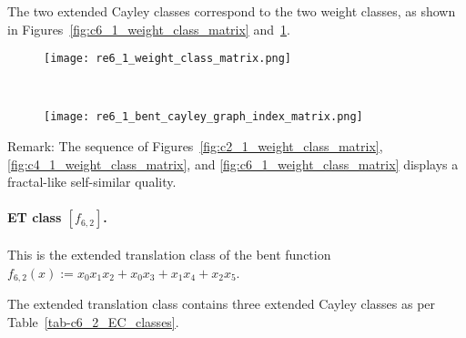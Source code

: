 \documentclass[12pt,a4paper]{article}
\begin{document}

The two extended Cayley classes correspond to the two weight classes,
as shown in Figures~\ref{fig:c6_1_weight_class_matrix} and~\ref{fig:c6_1_bent_cayley_graph_index_matrix}.

\begin{figure}[!bhpt] %
\centering
\begin{minipage}{.48\textwidth}
  \centering
  \texttt{[image: re6\_1\_weight\_class\_matrix.png]}
  \label{fig:c6_1_weight_class_matrix}
\end{minipage}%
~~~~
\begin{minipage}{.48\textwidth}
  \centering
  \texttt{[image: re6\_1\_bent\_cayley\_graph\_index\_matrix.png]}
  \label{fig:c6_1_bent_cayley_graph_index_matrix}
\end{minipage}
\end{figure}

Remark: The sequence of Figures~\ref{fig:c2_1_weight_class_matrix}, \ref{fig:c4_1_weight_class_matrix},
and \ref{fig:c6_1_weight_class_matrix} displays a fractal-like self-similar quality.

\paragraph*{ET class $[f_{6,2}]$.}
%
This is the extended translation class of the bent function
$f_{6,2}(x) := x_{0} x_{1} x_{2} + x_{0} x_{3} + x_{1} x_{4} + x_{2} x_{5}$.

The extended translation class contains three extended Cayley classes as per Table~\ref{tab-c6_2_EC_classes}.
\end{document}
